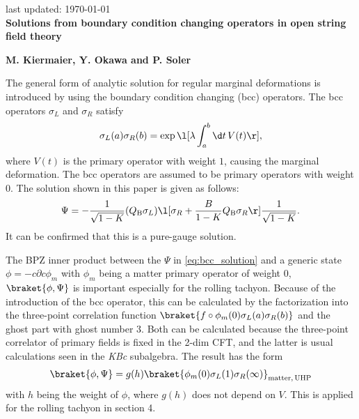 \documentclass[12pt]{article}
\date{}
\begin{document}
{\Large{}
\hfill{\normalsize last updated: \today}
\\[2mm]
\textbf{Solutions from boundary condition changing operators in open string field theory\cite{Kiermaier:2010cf}
}
}

\noindent
\hfill
\textbf{M. Kiermaier, Y. Okawa and P. Soler}%

\vspace{12pt}
The general form of analytic solution for regular marginal deformations is introduced by using the boundary condition changing (bcc) operators.
The bcc operators $\sigma_L$ and $\sigma_R$ satisfy
\begin{align}
	\sigma_L(a)\sigma_R(b) = \exp\l[\lambda\int_a^b\d t\,V(t) \r],
\end{align}
where $V(t)$ is the primary operator with weight $1$, causing the marginal deformation.
The bcc operators are assumed to be primary operators with weight $0$.
The solution shown in this paper is given as follows:
\begin{align}
	\Psi = -\frac{1}{\sqrt{1-K}}(Q_\mathrm{B}\sigma_L)
	\l[
	\sigma_R + \frac{B}{1-K}Q_\mathrm{B}\sigma_R
	\r]
	\frac{1}{\sqrt{1-K}}.\label{eq:bcc_solution}
\end{align}
It can be confirmed that this is a pure-gauge solution.

The BPZ inner product between the $\Psi$ in \eqref{eq:bcc_solution} and a generic state $\phi = -c\partial c\phi_m$ with $\phi_m$ being a matter primary operator of weight $0$, $\braket{\phi,\Psi}$ is important especially for the rolling tachyon.
Because of the introduction of the bcc operator, this can be calculated by the factorization into the three-point correlation function $\braket{f\circ \phi_m(0)\sigma_L(a)\sigma_R(b)}$ and the ghost part with ghost number $3$.
Both can be calculated because the three-point correlator of primary fields is fixed  in the 2-dim CFT, and the latter is usual calculations seen in the \textit{KBc} subalgebra.
The result has the form
\begin{align}
	\braket{\phi,\Psi} = g(h) \braket{\phi_m(0)\sigma_L(1)\sigma_R(\infty)}_{\mathrm{matter,\,UHP}}
\end{align}
with $h$ being the weight of $\phi$, where $g(h)$ does not depend on $V$.
This is applied for the rolling tachyon in section 4.



%
 

\end{document}
